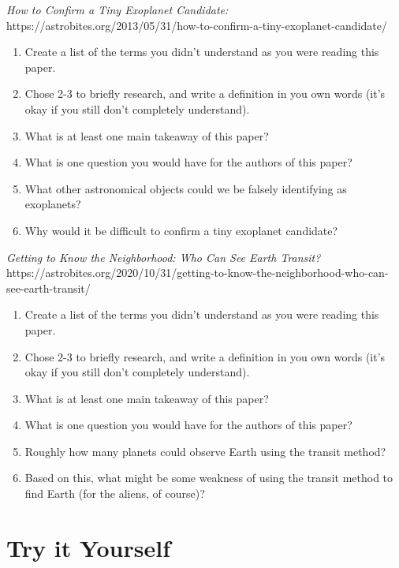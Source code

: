 \documentclass[11pt]{article}%
\begin{document}
\vspace{0.1in}

\emph{How to Confirm a Tiny Exoplanet Candidate:}
https://astrobites.org/2013/05/31/how-to-confirm-a-tiny-exoplanet-candidate/

\begin{enumerate}
\item  Create a list of the terms you didn't understand as you were reading this paper. 
\item Chose 2-3 to briefly research, and write a definition in you own words (it's okay if you still don't completely understand).
\item What is at least one main takeaway of this paper?
\item What is one question you would have for the authors of this paper?
\item What other astronomical objects could we be falsely identifying as exoplanets?
\item Why would it be difficult to confirm a tiny exoplanet candidate?
\end{enumerate}

\vspace{0.1in}

\emph{Getting to Know the Neighborhood: Who Can See Earth Transit?}
https://astrobites.org/2020/10/31/getting-to-know-the-neighborhood-who-can-see-earth-transit/

\begin{enumerate}
\item  Create a list of the terms you didn't understand as you were reading this paper. 
\item Chose 2-3 to briefly research, and write a definition in you own words (it's okay if you still don't completely understand).
\item What is at least one main takeaway of this paper?
\item What is one question you would have for the authors of this paper?
\item Roughly how many planets could observe Earth using the transit method?
\item Based on this, what might be some weakness of using the transit method to find Earth (for the aliens, of course)?
\end{enumerate}

\section{Try it Yourself} 
\end{document}
